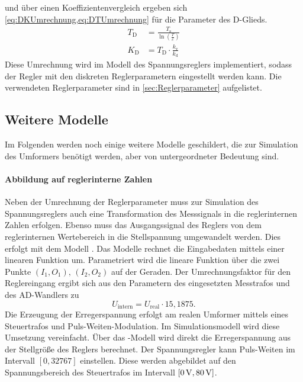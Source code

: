 und über einen Koeffizientenvergleich ergeben sich \cref{eq:DKUmrechnung,eq:DTUmrechnung} für die Parameter des D-Glieds.
\begin{align}
	T_\mathrm{D} &= \frac{T_\mathrm{s}}{\ln(\frac{T}{c})}\label{eq:DTUmrechnung}\\
	K_\mathrm{D} &= T_\mathrm{D}\cdot\frac{k_\mathrm{v}}{k_\mathrm{d}}\label{eq:DKUmrechnung}
\end{align}
Diese Umrechnung wird im Modell des Spannungsreglers implementiert, sodass der Regler mit den diskreten Reglerparametern eingestellt werden kann. Die verwendeten Reglerparameter sind in \cref{sec:Reglerparameter} aufgelistet.

\subsection{Weitere Modelle}\label{sec:WeitereModelle}
Im Folgenden werden noch einige weitere Modelle geschildert, die zur Simulation des Umformers benötigt werden, aber von untergeordneter Bedeutung sind.

\paragraph{Abbildung auf reglerinterne Zahlen}
\label{sec:AbbildungReglerZahlen}
Neben der Umrechnung der Reglerparameter muss zur Simulation des Spannungsreglers auch eine Transformation des Messsignals in die reglerinternen Zahlen erfolgen. Ebenso muss das Ausgangssignal des Reglers von dem reglerinternen Wertebereich in die Stellspannung umgewandelt werden. Dies erfolgt mit dem Modell . Das Modelle rechnet die Eingabedaten mittels einer linearen Funktion um. Parametriert wird die lineare Funktion über die zwei Punkte $(I_1,O_1),\,(I_2,O_2)$ auf der Geraden. Der Umrechnungsfaktor für den Reglereingang ergibt sich aus den Parametern des eingesetzten Messtrafos und des AD-Wandlers zu
\begin{equation}
	U_\mathrm{intern} = U_\mathrm{real}\cdot 15,1875.
\end{equation}
Die Erzeugung der Erregerspannung erfolgt am realen Umformer mittels eines Steuertrafos und Puls-Weiten-Modulation. Im Simulationsmodell wird diese Umsetzung vereinfacht. Über das -Modell wird direkt die Erregerspannung aus der Stellgröße des Reglers berechnet. Der Spannungsregler kann Puls-Weiten im Intervall $[0,32767]$ einstellen. Diese werden abgebildet auf den Spannungsbereich des Steuertrafos im Intervall $[\unit[0]{V},\unit[80]{V}]$. %

